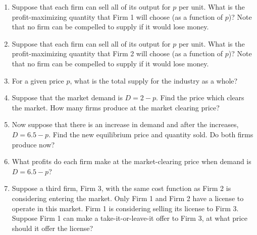 \documentclass{article}
\begin{document}
\begin{enumerate}
\item Suppose that each firm can sell all of its output for $p$ per unit. What is the profit-maximizing quantity that Firm 1 will choose (as a function of $p$)? Note that no firm can be compelled to supply if it would lose money.
\item Suppose that each firm can sell all of its output for $p$ per unit. What is the profit-maximizing quantity that Firm 2 will choose (as a function of $p$)? Note that no firm can be compelled to supply if it would lose money.
\item For a given price $p$, what is the total supply for the industry as a whole?
\item Suppose that the market demand is $D = 2-p$. Find the price which clears the market.  How many firms produce at the market clearing price?
\item Now suppose that there is an increase in demand and after the increases, $D = 6.5 - p$. Find the new equilibrium price and quantity sold. Do both firms produce now?
\item What profits do each firm make at the market-clearing price when demand is $D = 6.5 - p$?
\item Suppose a third firm, Firm 3, with the same cost function as Firm 2  is considering entering the market. Only Firm 1 and Firm 2 have a license to operate in this market. Firm 1 is considering selling its license to Firm 3. Suppose Firm 1 can make a take-it-or-leave-it offer to Firm 3, at what price should it offer the license?
\end{enumerate}
\end{document}

